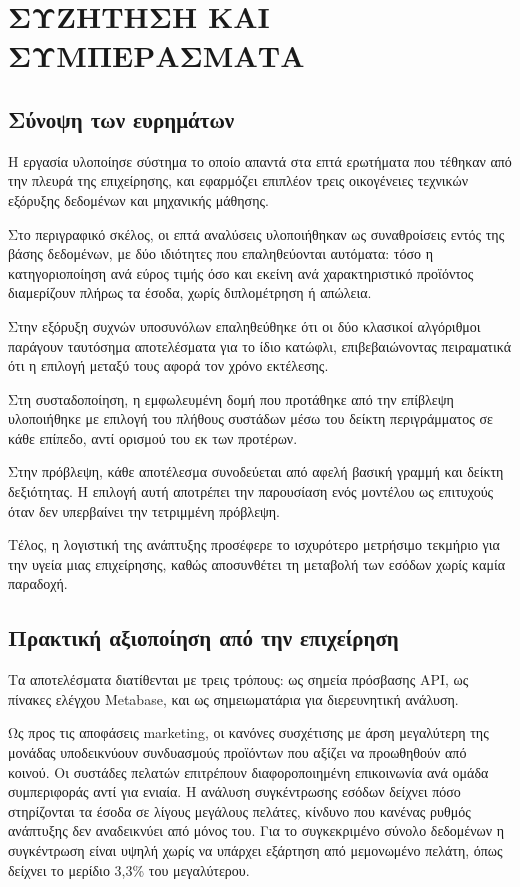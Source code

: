 \chapter{ΣΥΖΗΤΗΣΗ ΚΑΙ ΣΥΜΠΕΡΑΣΜΑΤΑ}
\label{chap:conclusions}

\section{Σύνοψη των ευρημάτων}

Η εργασία υλοποίησε σύστημα το οποίο απαντά στα επτά ερωτήματα που τέθηκαν από
την πλευρά της επιχείρησης, και εφαρμόζει επιπλέον τρεις οικογένειες τεχνικών
εξόρυξης δεδομένων και μηχανικής μάθησης.

Στο περιγραφικό σκέλος, οι επτά αναλύσεις υλοποιήθηκαν ως συναθροίσεις εντός
της βάσης δεδομένων, με δύο ιδιότητες που επαληθεύονται αυτόματα: τόσο η
κατηγοριοποίηση ανά εύρος τιμής όσο και εκείνη ανά χαρακτηριστικό προϊόντος
διαμερίζουν πλήρως τα έσοδα, χωρίς διπλομέτρηση ή απώλεια.

Στην εξόρυξη συχνών υποσυνόλων επαληθεύθηκε ότι οι δύο κλασικοί αλγόριθμοι
παράγουν ταυτόσημα αποτελέσματα για το ίδιο κατώφλι, επιβεβαιώνοντας
πειραματικά ότι η επιλογή μεταξύ τους αφορά τον χρόνο εκτέλεσης.

Στη συσταδοποίηση, η εμφωλευμένη δομή που προτάθηκε από την επίβλεψη
υλοποιήθηκε με επιλογή του πλήθους συστάδων μέσω του δείκτη περιγράμματος σε
κάθε επίπεδο, αντί ορισμού του εκ των προτέρων.

Στην πρόβλεψη, κάθε αποτέλεσμα συνοδεύεται από αφελή βασική γραμμή και δείκτη
δεξιότητας. Η επιλογή αυτή αποτρέπει την παρουσίαση ενός μοντέλου ως επιτυχούς
όταν δεν υπερβαίνει την τετριμμένη πρόβλεψη.

Τέλος, η λογιστική της ανάπτυξης προσέφερε το ισχυρότερο μετρήσιμο τεκμήριο για την
υγεία μιας επιχείρησης, καθώς αποσυνθέτει τη μεταβολή των εσόδων χωρίς καμία
παραδοχή.

\section{Πρακτική αξιοποίηση από την επιχείρηση}

Τα αποτελέσματα διατίθενται με τρεις τρόπους: ως σημεία πρόσβασης
\textenglish{API}, ως πίνακες ελέγχου \textenglish{Metabase}, και ως
σημειωματάρια για διερευνητική ανάλυση.

Ως προς τις αποφάσεις marketing, οι κανόνες συσχέτισης με άρση μεγαλύτερη της
μονάδας υποδεικνύουν συνδυασμούς προϊόντων που αξίζει να προωθηθούν από κοινού.
Οι συστάδες πελατών επιτρέπουν διαφοροποιημένη επικοινωνία ανά ομάδα
συμπεριφοράς αντί για ενιαία. Η ανάλυση συγκέντρωσης εσόδων δείχνει πόσο
στηρίζονται τα έσοδα σε λίγους μεγάλους πελάτες, κίνδυνο που κανένας ρυθμός
ανάπτυξης δεν αναδεικνύει από μόνος του. Για το συγκεκριμένο σύνολο δεδομένων
η συγκέντρωση είναι υψηλή χωρίς να υπάρχει εξάρτηση από μεμονωμένο πελάτη,
όπως δείχνει το μερίδιο 3,3\% του μεγαλύτερου.

